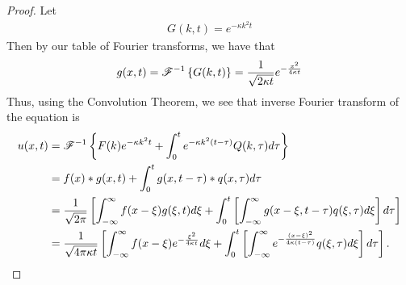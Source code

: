 \begin{proof}
  Let
  \begin{align*}
    G(k, t) = e^{-\kappa k^2 t}
  \end{align*}
  Then by our table of Fourier transforms, we have that
  \begin{align*}
    g(x, t) = \mathscr{F}^{-1}\left\{ {G(k, t)} \right\} = \frac{1}{\sqrt{2\kappa t}}e^{-\frac{x^2}{4\kappa t}}
  \end{align*}
  Thus, using the Convolution Theorem, we see that inverse Fourier transform of the equation is
  \begin{align*}
    u(x, t) &= \mathscr{F}^{-1}\left\{ {F(k) e^{-\kappa k^2 t} + \int_0^te^{-\kappa k^2 (t-\tau)}Q(k, \tau) d\tau} \right\} \\
    &= f(x) \ast g(x, t) + \int_0^t g(x, t-\tau) \ast q(x, \tau) d\tau \\
    &= \frac{1}{\sqrt{2\pi}}\left[\int_{-\infty}^\infty f(x-\xi)g(\xi, t) d\xi + \int_0^t \left[\int_{-\infty}^\infty g(x - \xi, t - \tau) q(\xi, \tau) d\xi\right] d\tau\right] \\
    &= \frac{1}{\sqrt{4\pi\kappa t}}\left[\int_{-\infty}^\infty f(x-\xi)e^{-\frac{\xi^2}{4\kappa t}} d\xi + \int_0^t \left[\int_{-\infty}^\infty e^{-\frac{(x-\xi)^2}{4\kappa (t-\tau)}} q(\xi, \tau) d\xi\right] d\tau\right].
  \end{align*}

\end{proof}
\newpage
